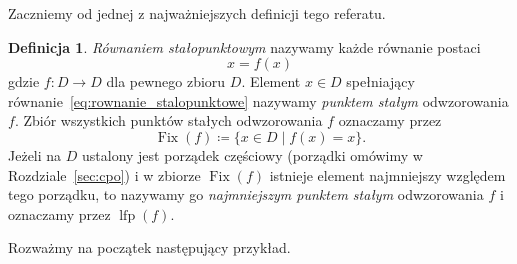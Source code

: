 \documentclass[11pt,a4paper]{article}
\theoremstyle{definition}
\newtheorem{definicja}{Definicja}[section]
\theoremstyle{plain}
\newcommand{\Fix}{\operatorname{Fix}}            %
\newcommand{\lfp}{\operatorname{lfp}}
\begin{document}
Zaczniemy od jednej z najważniejszych definicji tego referatu.

\begin{definicja}\label{def:rownanie_stalopunktowe}
	\emph{Równaniem stałopunktowym} nazywamy każde równanie postaci
	\begin{equation}
		\label{eq:rownanie_stalopunktowe}
		x=f(x)
		\tag{FP}
	\end{equation}
	gdzie $f:D\to D$ dla pewnego zbioru $D$. Element $x\in D$ spełniający
	równanie~\eqref{eq:rownanie_stalopunktowe} nazywamy \emph{punktem stałym} odwzorowania $f$. Zbiór wszystkich punktów
	stałych odwzorowania $f$ oznaczamy przez
	\[
	\Fix(f)\coloneqq \{x\in D\mid f(x)=x\}.
	\]
	Jeżeli na $D$ ustalony jest porządek częściowy (porządki omówimy
	w Rozdziale~\ref{sec:cpo}) i w zbiorze $\Fix(f)$ istnieje element
	najmniejszy względem tego porządku, to nazywamy go \emph{najmniejszym punktem
		stałym} odwzorowania $f$ i oznaczamy przez $\lfp(f)$.
\end{definicja}

Rozważmy na początek następujący przykład.
\end{document}
